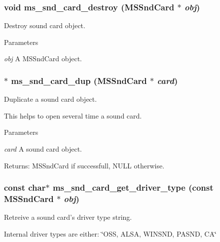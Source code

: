 \subsubsection[{ms\_\-snd\_\-card\_\-destroy}]{\setlength{\rightskip}{0pt plus 5cm}void ms\_\-snd\_\-card\_\-destroy ({\bf MSSndCard} $\ast$ {\em obj})}\label{group__mediastreamer2__soundcardfilter_gae43714f334f9098e4ab8aa0d6aa1f6bf}
Destroy sound card object.


\begin{DoxyParams}{Parameters}
\item[{\em obj}]A MSSndCard object. \end{DoxyParams}
\subsubsection[{ms\_\-snd\_\-card\_\-dup}]{$\ast$ ms\_\-snd\_\-card\_\-dup ({\bf MSSndCard} $\ast$ {\em card})}\label{group__mediastreamer2__soundcardfilter_ga16a62db158078a8ff7cf1c17fefe74a6}
Duplicate a sound card object.

This helps to open several time a sound card.


\begin{DoxyParams}{Parameters}
\item[{\em card}]A sound card object.\end{DoxyParams}
Returns: MSSndCard if successfull, NULL otherwise. 
\subsubsection[{ms\_\-snd\_\-card\_\-get\_\-driver\_\-type}]{\setlength{\rightskip}{0pt plus 5cm}const char$\ast$ ms\_\-snd\_\-card\_\-get\_\-driver\_\-type (const {\bf MSSndCard} $\ast$ {\em obj})}\label{group__mediastreamer2__soundcardfilter_ga9b7d26ee313ab9aa4cc2b345bcc3a951}
Retreive a sound card's driver type string.

Internal driver types are either: \char`\"{}OSS, ALSA, WINSND, PASND, CA\char`\"{}


